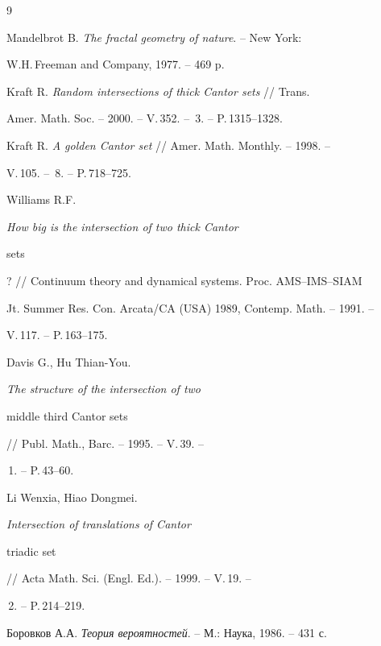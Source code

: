 \begin{thebibliography}{9} 


 




Mandelbrot B. {\em The fractal geometry of nature}. -- New York: 


W.H.\,Freeman and Company, 1977. -- 469 p. 




Kraft R. {\em Random intersections of thick Cantor sets} // Trans. 


Amer. Math. Soc. -- 2000. -- V.\,352. -- \No\,3. -- P.\,1315--1328. 




Kraft R. {\em A golden Cantor set} // Amer. Math. Monthly. -- 1998. -- 


V.\,105. -- \No\,8. -- P.\,718--725. 




Williams R.F. {\em How big is the intersection of two thick Cantor 


sets}? // Continuum theory and dynamical systems. Proc. AMS--IMS--SIAM 


Jt. Summer Res. Con. Arcata/CA (USA) 1989, Contemp. Math. -- 1991. -- 


V.\,117. -- P.\,163--175. 




Davis G., Hu Thian-You. {\em The structure of the intersection of two 


middle third Cantor sets} // Publ. Math., Barc. -- 1995. -- V.\,39. -- 


\No\,1. -- P.\,43--60. 




Li Wenxia, Hiao Dongmei. {\em Intersection of translations of Cantor 


triadic set} // Acta Math. Sci. (Engl. Ed.). -- 1999. -- V.\,19. -- 


\No\,2. -- P.\,214--219. 




Боровков А.А. {\em Теория вероятностей}. -- М.: Наука, 1986. -- 431 с. 


 


\end{thebibliography} 


 


\vskip 2cm 


 






 


\label{end} 


 


